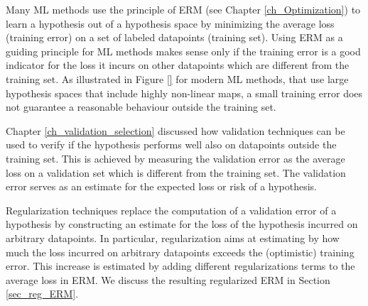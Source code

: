 \documentclass[12pt]{report}
\begin{document}

Many ML methods use the principle of ERM (see Chapter \ref{ch_Optimization}) 
to learn a hypothesis out of a hypothesis space by minimizing the average loss 
(training error) on a set of labeled datapoints (training set). Using ERM as a guiding 
principle for ML methods makes sense only if the training error is a good indicator 
for the loss it incurs on other datapoints which are different from the training set. 
As illustrated in Figure \ref{} for modern ML methods, that use large hypothesis 
spaces that include highly non-linear maps, a small training error does not guarantee 
a reasonable behaviour outside the training set. 


Chapter \ref{ch_validation_selection} discussed how validation techniques 
can be used to verify if the hypothesis performs well also on datapoints 
outside the training set. This is achieved by measuring the validation error 
as the average loss on a validation set which is different from the training set. 
The validation error serves as an estimate for the expected loss or risk of a 
hypothesis. 

Regularization techniques replace the computation of a validation error of a 
hypothesis by constructing an estimate for the loss of the hypothesis incurred 
on arbitrary datapoints. In particular, regularization aims at estimating by how 
much the loss incurred on arbitrary datapoints exceeds the (optimistic) 
training error. This increase is estimated by adding different regularizations 
terms to the average loss in ERM. We discuss the resulting regularized ERM 
in Section \ref{sec_reg_ERM}. 
\end{document}
